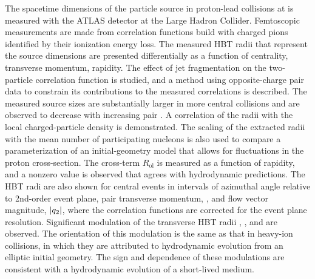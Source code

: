 The spacetime dimensions of the particle source in proton-lead collisions at \pPbenergy is measured with the ATLAS detector at the Large Hadron Collider.
Femtoscopic measurements are made from correlation functions build with charged pions identified by their ionization energy loss.
The measured HBT radii that represent the source dimensions are presented differentially as a function of centrality, transverse momentum, rapidity.
The effect of jet fragmentation on the two-particle correlation function is studied, and a method using opposite-charge pair data to constrain its contributions to the measured correlations is described.
The measured source sizes are substantially larger in more central collisions and are observed to decrease with increasing pair \kt.
A correlation of the radii with the local charged-particle density \dNdy is demonstrated.
The scaling of the extracted radii with the mean number of participating nucleons is also used to compare a parameterization of an initial-geometry model that allows for fluctuations in the proton cross-section.
The cross-term $R_\mathrm{ol}$ is measured as a function of rapidity, and a nonzero value is observed that agrees with hydrodynamic predictions.
The HBT radi are also shown for central events in intervals of azimuthal angle relative to 2nd-order event plane, pair transverse momentum, \kt, and flow vector magnitude, $|q_{2}|$, where the correlation functions are corrected for the event plane resolution.
Significant modulation of the transverse HBT radii \Rout, \Rside, and \Ros are observed.
The orientation of this modulation is the same as that in heavy-ion collisions, in which they are attributed to hydrodynamic evolution from an elliptic initial geometry.
The sign and \kt dependence of these modulations are consistent with a hydrodynamic evolution of a short-lived medium.

